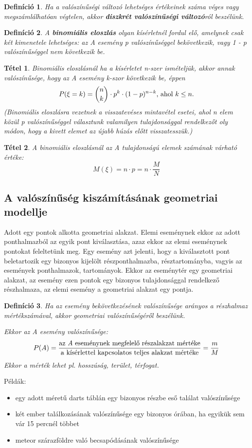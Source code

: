 \documentclass[12pt,a4paper]{article}
\newtheorem{theorem}{Tétel} [section]
\newtheorem{definition}{Definíció} [section]
\begin{document}
\begin{definition}
Ha a valószínűségi változó lehetséges értékeinek száma véges vagy megszámlálhatóan végtelen, akkor \textbf{diszkrét valószínűségi változó}ról beszélünk.
\end{definition}
\begin{definition}
 A \textbf{binomiális eloszlás} olyan kísérletnél fordul elő, amelynek csak két kimenetele lehetséges: az A esemény p valószínűséggel bekövetkezik, vagy 1 - p valószínűséggel nem következik be.
\end{definition}
\begin{theorem}
Binomiális eloszlásnál ha a kísérletet n-szer ismételjük, akkor annak valószínűsége, hogy az A esemény k-szor következik be, éppen
\[P(\xi=k)=\binom{n}{k}\cdot p^k\cdot (1-p)^{n-k}\text{\normalfont , ahol }k\leq n.\]
(Binomiális eloszlásra vezetnek a visszatevéses mintavétel esetei, ahol n elem közül p valószínűséggel választunk valamilyen tulajdonsággal rendelkezőt oly módon, hogy a kivett elemet az újabb húzás előtt visszatesszük.)
\end{theorem}
\begin{theorem}
A binomiális eloszlásnál az A tulajdonságú elemek számának várható értéke:
\[M(\xi)=n\cdot p=n\cdot\dfrac{M}{N}\]
\end{theorem}
\subsection{A valószínűség kiszámításának geometriai modellje}
Adott egy pontok alkotta geometriai alakzat. Elemi eseménynek ekkor az adott ponthalmazból az egyik pont kiválasztása, azaz ekkor az elemi eseménynek pontokat feleltetünk meg. Egy esemény azt jelenti, hogy a kiválasztott pont beletartozik egy bizonyos kijelölt részponthalmazba, résztartományba, vagyis az események ponthalmazok, tartományok. Ekkor az eseménytér egy geometriai alakzat, az esemény ezen pontok egy bizonyos tulajdonsággal rendelkező részhalmaza, az elemi esemény a geometriai alakzat egy pontja.

\begin{definition}
Ha az esemény bekövetkezésének valószínűsége arányos a részhalmaz mértékszámával, akkor geometriai valószínűségéről beszélünk.

Ekkor az A esemény valószínűsége:
\[P(A)=\dfrac{\text{\normalfont az \textit{A} eseménynek megfelelő részalakzat mértéke}}{\text{\normalfont a kísérlettel kapcsolatos teljes alakzat mértéke}}=\dfrac{m}{M}\]
Ekkor a mérték lehet pl. hosszúság, terület, térfogat.
\end{definition}
Példák:
\begin{itemize}
\item egy adott méretű darts táblán egy bizonyos részbe eső találat valószínűsége
\item két ember találkozásának valószínűsége egy bizonyos órában, ha egyikük sem vár 15 percnél többet
\item  meteor szárazföldre való becsapódásának valószínűsége
\end{itemize}
\end{document}
